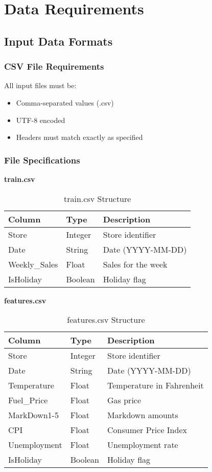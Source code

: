 \chapter{Data Requirements}

\section{Input Data Formats}

\subsection{CSV File Requirements}
All input files must be:
\begin{itemize}
	\item Comma-separated values (.csv)
	\item UTF-8 encoded
	\item Headers must match exactly as specified
\end{itemize}

\subsection{File Specifications}

\textbf{train.csv}
\begin{table}[h]
	\centering
	\begin{tabular}{|l|l|l|}
		\hline
		\textbf{Column} & \textbf{Type} & \textbf{Description} \\
		\hline
		Store & Integer & Store identifier \\
		Date & String & Date (YYYY-MM-DD) \\
		Weekly\_Sales & Float & Sales for the week \\
		IsHoliday & Boolean & Holiday flag \\
		\hline
	\end{tabular}
	\caption{train.csv Structure}
\end{table}

\textbf{features.csv}
\begin{table}[h]
	\centering
	\begin{tabular}{|l|l|l|}
		\hline
		\textbf{Column} & \textbf{Type} & \textbf{Description} \\
		\hline
		Store & Integer & Store identifier \\
		Date & String & Date (YYYY-MM-DD) \\
		Temperature & Float & Temperature in Fahrenheit \\
		Fuel\_Price & Float & Gas price \\
		MarkDown1-5 & Float & Markdown amounts \\
		CPI & Float & Consumer Price Index \\
		Unemployment & Float & Unemployment rate \\
		IsHoliday & Boolean & Holiday flag \\
		\hline
	\end{tabular}
	\caption{features.csv Structure}
\end{table}

